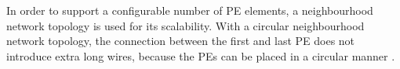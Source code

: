 In order to support a configurable number of PE elements, a neighbourhood network topology is used for its scalability. With a circular neighbourhood network topology, the connection between the first and last PE does not introduce extra long wires, because the PEs can be placed in a circular manner \cite{dongrio2}.








